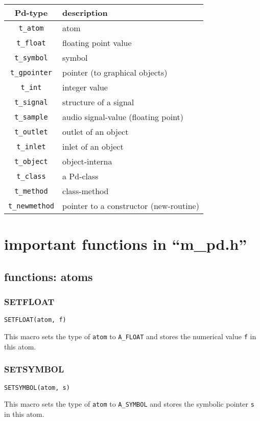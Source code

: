 \documentclass[12pt, a4paper,english,titlepage]{article}
\begin{document}
\begin{appendix}
\begin{tabular}{c|l}
Pd-type & description \\
\hline\hline
\verb+t_atom+& atom \\
\verb+t_float+ & floating point value\\
\verb+t_symbol+ & symbol \\
\verb+t_gpointer+ & pointer (to graphical objects) \\
\hline
\verb+t_int+ & integer value \\
\verb+t_signal+ & structure of a signal \\
\verb+t_sample+ & audio signal-value (floating point)\\
\verb+t_outlet+ & outlet of an object \\
\verb+t_inlet+ & inlet of an object \\
\verb+t_object+ & object-interna \\
\hline
\verb+t_class+ & a Pd-class \\
\verb+t_method+ & class-method \\
\verb+t_newmethod+ & pointer to a constructor (new-routine) \\
\end{tabular}


\section{important functions in ``m\_pd.h''}

\subsection{functions: atoms}

\subsubsection{SETFLOAT}
\begin{verbatim}
SETFLOAT(atom, f)
\end{verbatim}
This macro sets the type of \verb+atom+ to \verb+A_FLOAT+
and stores the numerical value \verb+f+ in this atom.

\subsubsection{SETSYMBOL}
\begin{verbatim}
SETSYMBOL(atom, s)
\end{verbatim}
This macro sets the type of \verb+atom+ to \verb+A_SYMBOL+
and stores the symbolic pointer \verb+s+ in this atom.


\end{appendix}
\end{document}
